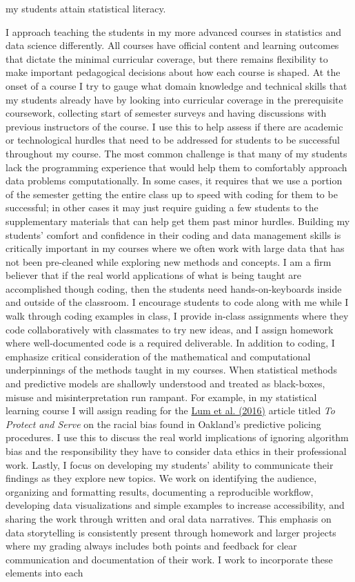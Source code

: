 \documentclass[letterpaper,12pt]{article}\usepackage[]{graphicx}\usepackage[]{color}
\begin{document}
my students attain statistical literacy.

I approach teaching the students in my more advanced courses in statistics and data science differently. All courses have official content and learning outcomes that dictate the minimal curricular coverage, but there remains flexibility to make important pedagogical decisions about how each course is shaped. At the onset of a course I try to gauge what domain knowledge and technical skills that my students already have by looking into curricular coverage in the prerequisite coursework, collecting start of semester surveys and having discussions with previous instructors of the course. I use this to help assess if there are academic or technological hurdles that need to be addressed for students to be successful throughout my course. The most common challenge is that many of my students lack the programming experience that would help them to comfortably approach data problems computationally. In some cases, it requires that we use a portion of the semester getting the entire class up to speed with coding for them to be successful; in other cases it may just require guiding a few students to the supplementary materials that can help get them past minor hurdles. Building my students' comfort and confidence in their coding and data management skills is critically important in my courses where we often work with large data that has not been pre-cleaned while exploring new methods and concepts. I am a firm believer that if the real world applications of what is being taught are accomplished though coding, then the students need hands-on-keyboards inside and outside of the classroom. I encourage students to code along with me while I walk through coding examples in class, I provide in-class assignments where they code collaboratively with classmates to try new ideas, and I assign homework where well-documented code is a required deliverable. In addition to coding, I emphasize critical consideration of the mathematical and computational underpinnings of the methods taught in my courses. When statistical methods and predictive models are shallowly understood and treated as black-boxes, misuse and misinterpretation run rampant. For example, in my statistical learning course I will assign reading for the \href{https://rss.onlinelibrary.wiley.com/doi/epdf/10.1111/j.1740-9713.2016.00960.x}{Lum et al. (2016)} article titled {\it To Protect and Serve} on the racial bias found in Oakland's predictive policing procedures. I use this to discuss the real world implications of ignoring algorithm bias and the responsibility they have to consider data ethics in their professional work. Lastly, I focus on developing my students' ability to communicate their findings as they explore new topics. We work on identifying the audience, organizing and formatting results, documenting a reproducible workflow, developing data visualizations and simple examples to increase accessibility, and sharing the work through written and oral data narratives. This emphasis on data storytelling is consistently present through homework and larger projects where my grading always includes both points and feedback for clear communication and documentation of their work. I work to incorporate these elements into each 
\end{document}

